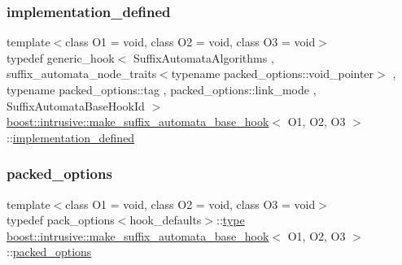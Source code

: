 \subsubsection{\texorpdfstring{implementation\+\_\+defined}{implementation\_defined}}
{\footnotesize\ttfamily template$<$class O1 = void, class O2 = void, class O3 = void$>$ \\
typedef generic\+\_\+hook$<$ Suffix\+Automata\+Algorithms , suffix\+\_\+automata\+\_\+node\+\_\+traits$<$typename packed\+\_\+options\+::void\+\_\+pointer$>$ , typename packed\+\_\+options\+::tag , packed\+\_\+options\+::link\+\_\+mode , Suffix\+Automata\+Base\+Hook\+Id $>$ \hyperlink{classboost_1_1intrusive_1_1make__suffix__automata__base__hook}{boost\+::intrusive\+::make\+\_\+suffix\+\_\+automata\+\_\+base\+\_\+hook}$<$ O1, O2, O3 $>$\+::\hyperlink{classboost_1_1intrusive_1_1make__suffix__automata__base__hook_a8b3a0f3343ae07dbe98811acc5c67d10}{implementation\+\_\+defined}}

\mbox{\label{classboost_1_1intrusive_1_1make__suffix__automata__base__hook_af169eb92a361f67464ec4beb9ff5a314}} 
\subsubsection{\texorpdfstring{packed\+\_\+options}{packed\_options}}
{\footnotesize\ttfamily template$<$class O1 = void, class O2 = void, class O3 = void$>$ \\
typedef pack\+\_\+options$<$hook\+\_\+defaults$>$\+::\hyperlink{classboost_1_1intrusive_1_1make__suffix__automata__base__hook_a3fbc0981de4bc6f6e162259d87cfa3aa}{type} \hyperlink{classboost_1_1intrusive_1_1make__suffix__automata__base__hook}{boost\+::intrusive\+::make\+\_\+suffix\+\_\+automata\+\_\+base\+\_\+hook}$<$ O1, O2, O3 $>$\+::\hyperlink{classboost_1_1intrusive_1_1make__suffix__automata__base__hook_af169eb92a361f67464ec4beb9ff5a314}{packed\+\_\+options}}

\mbox{\label{classboost_1_1intrusive_1_1make__suffix__automata__base__hook_a3fbc0981de4bc6f6e162259d87cfa3aa}} 

